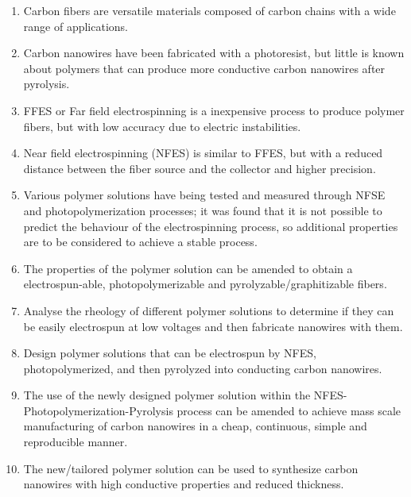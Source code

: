 \documentclass[11pt,a4paper]{article}
\begin{document}
\begin{enumerate}
  \item {Carbon fibers are versatile materials composed of carbon chains with a wide range of applications.}
  \item {Carbon nanowires have been fabricated with a photoresist, but little is known about polymers that can produce more conductive carbon nanowires after pyrolysis.}
  \item {FFES or Far field electrospinning is a inexpensive process to produce polymer fibers, but with low accuracy due to electric instabilities.}
  \item {Near field electrospinning (NFES) is similar to FFES, but with a reduced distance between the fiber source and the collector and higher precision.}
  \item {Various polymer solutions have being tested and measured through NFSE and photopolymerization processes; it was found that it is not possible to predict the behaviour of the electrospinning process, so additional properties are to be considered to achieve a stable process.}
  \item {The properties of the polymer solution can be amended to obtain a electrospun-able, photopolymerizable and pyrolyzable/graphitizable fibers.}
  \item {Analyse the rheology of different polymer solutions to determine if they can be easily electrospun at low voltages and then fabricate nanowires with them.}
  \item {Design polymer solutions that can be electrospun by NFES, photopolymerized, and then pyrolyzed into conducting carbon nanowires.}
  \item {The use of the newly designed polymer solution within the NFES-Photopolymerization-Pyrolysis process can be amended to achieve mass scale manufacturing of carbon nanowires in a cheap, continuous, simple and reproducible manner.}
  \item {The new/tailored polymer solution can be used to synthesize carbon nanowires with high conductive properties and reduced thickness.}
\end{enumerate}

\clearpage



\end{document}

